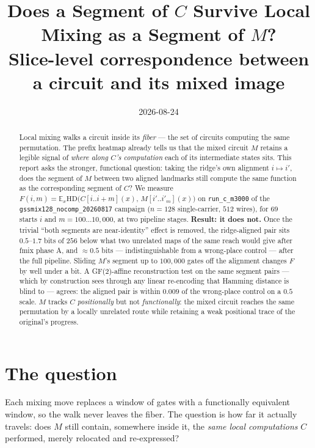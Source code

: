 \documentclass[11pt]{article}
\title{Does a Segment of $C$ Survive Local Mixing as a Segment of $M$?\\
\large Slice-level correspondence between a circuit and its mixed image}
\date{2026-08-24}
\author{}
\newcommand{\code}[1]{\texttt{#1}}
\newcommand{\HD}{\mathrm{HD}}
\newcommand{\Ex}{\mathbb{E}_x}
\begin{document}
\maketitle
\vspace{-2.5em}

\begin{abstract}
Local mixing walks a circuit inside its \emph{fiber} --- the set of circuits computing the same
permutation. The prefix heatmap already tells us that the mixed circuit $M$ retains a legible signal of
\emph{where along $C$'s computation} each of its intermediate states sits. This report asks the
stronger, functional question: taking the ridge's own alignment $i \mapsto i'$, does the segment of $M$
between two aligned landmarks still compute the same function as the corresponding segment of $C$? We
measure $F(i,m)=\Ex \HD\!\big(C[i..i{+}m](x),\,M[i'..i'_m](x)\big)$ on \code{run\_c\_m3000} of the
\code{gssmix128\_nocomp\_20260817} campaign ($n=128$ single-carrier, $512$ wires), for $69$ starts $i$
and $m=100\ldots10{,}000$, at two pipeline stages. \textbf{Result: it does not.} Once the trivial
``both segments are near-identity'' effect is removed, the ridge-aligned pair sits $0.5$--$1.7$ bits of
$256$ below what two unrelated maps of the same reach would give after fmix phase A, and
$\approx\!0.5$ bits --- indistinguishable from a wrong-place control --- after the full pipeline.
Sliding $M$'s segment up to $100{,}000$ gates off the alignment changes $F$ by well under a bit. A
GF(2)-affine reconstruction test on the same segment pairs --- which by construction sees through any
linear re-encoding that Hamming distance is blind to --- agrees: the aligned pair is within $0.009$ of
the wrong-place control on a $0.5$ scale. $M$ tracks $C$ \emph{positionally} but not
\emph{functionally}: the mixed circuit reaches the same permutation by a locally unrelated route while
retaining a weak positional trace of the original's progress.
\end{abstract}

\section{The question}

Each mixing move replaces a window of gates with a functionally equivalent window, so the walk never
leaves the fiber. The question is how far it actually travels: does $M$ still contain, somewhere inside
it, the \emph{same local computations} $C$ performed, merely relocated and re-expressed?
\end{document}
